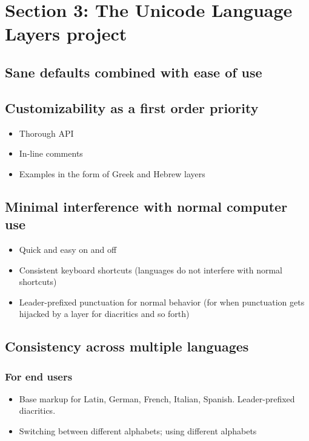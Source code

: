 \documentclass[11pt]{article}
\begin{document}
\section{Section 3: The Unicode Language Layers project}
\label{sec:orgc1a8de6}

\subsection{Sane defaults combined with ease of use}
\label{sec:org5bd2588}

\subsection{Customizability as a first order priority}
\label{sec:org96a8feb}

\begin{itemize}
\item Thorough API
\item In-line comments
\item Examples in the form of Greek and Hebrew layers
\end{itemize}

\subsection{Minimal interference with normal computer use}
\label{sec:org6678ca0}

\begin{itemize}
\item Quick and easy on and off
\item Consistent keyboard shortcuts (languages do not interfere with normal shortcuts)
\item Leader-prefixed punctuation for normal behavior (for when punctuation gets hijacked by a layer for diacritics and so forth)
\end{itemize}

\subsection{Consistency across multiple languages}
\label{sec:org897ba5d}

\subsubsection{For end users}
\label{sec:org3a52445}

\begin{itemize}
\item Base markup for Latin, German, French, Italian, Spanish. Leader-prefixed diacritics.
\item Switching between different alphabets; using different alphabets
\end{itemize}
\end{document}
